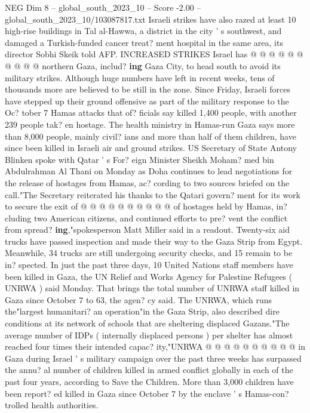 \begin{textsample}{NEG Dim 8 – global\_south\_2023\_10 – Score -2.00 – global\_south\_2023\_10/103087817.txt}
Israeli strikes have also razed at least 10 high-rise buildings in Tal al-Hawwa, a district in the city ' s southwest, and damaged a Turkish-funded cancer treat? ment hospital in the same area, its director Sobhi Skeik told AFP.
INCREASED STRIKES Israel has @ @ @ @ @ @ @ @ @ @ northern Gaza, includ? \textbf{ing} Gaza City, to head south to avoid its military strikes.
Although huge numbers have left in recent weeks, tens of thousands more are believed to be still in the zone.
Since Friday, Israeli forces have stepped up their ground offensive as part of the military response to the Oc? tober 7 Hamas attacks that of? ficials say killed 1,400 people, with another 239 people tak? en hostage.
The health ministry in Hamas-run Gaza says more than 8,000 people, mainly civil? ians and more than half of them children, have since been killed in Israeli air and ground strikes.
US Secretary of State Antony Blinken spoke with Qatar ' s For? eign Minister Sheikh Moham? med bin Abdulrahman Al Thani on Monday as Doha continues to lead negotiations for the release of hostages from Hamas, ac? cording to two sources briefed on the call."The Secretary reiterated his thanks to the Qatari govern? ment for its work to secure the exit of @ @ @ @ @ @ @ @ @ @ of hostages held by Hamas, in? cluding two American citizens, and continued efforts to pre? vent the conflict from spread? \textbf{ing},"spokesperson Matt Miller said in a readout.
Twenty-six aid trucks have passed inspection and made their way to the Gaza Strip from Egypt.
Meanwhile, 34 trucks are still undergoing security checks, and 15 remain to be in? spected.
In just the past three days, 10 United Nations staff members have been killed in Gaza, the UN Relief and Works Agency for Palestine Refugees ( UNRWA ) said Monday.
That brings the total number of UNRWA staff killed in Gaza since October 7 to 63, the agen? cy said.
The UNRWA, which runs the"largest humanitari? an operation"in the Gaza Strip, also described dire conditions at its network of schools that are sheltering displaced Gazans."The average number of IDPs ( internally displaced persons ) per shelter has almost reached four times their intended capac? ity,"UNRWA @ @ @ @ @ @ @ @ @ @ in Gaza during Israel ' s military campaign over the past three weeks has surpassed the annu? al number of children killed in armed conflict globally in each of the past four years, according to Save the Children.
More than 3,000 children have been report? ed killed in Gaza since October 7 by the enclave ' s Hamas-con? trolled health authorities.

\end{textsample}
